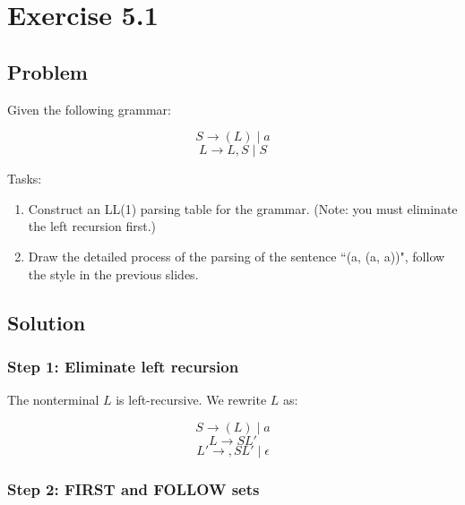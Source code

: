 


\chapter{Exercise 5.1}

\section{Problem}

Given the following grammar:

\[
S \to (L) \;|\; a
\]
\[
L \to L , S \;|\; S
\]

Tasks:
\begin{enumerate}
	\item Construct an LL(1) parsing table for the grammar. (Note: you must eliminate the left recursion first.)
	\item Draw the detailed process of the parsing of the sentence ``(a, (a, a))", follow the style in the previous slides.
\end{enumerate}

\section{Solution}

\subsection{Step 1: Eliminate left recursion}

The nonterminal $L$ is left-recursive. We rewrite $L$ as:

\[
S \to (L) \;|\; a
\]
\[
L \to S L'
\]
\[
L' \to , S L' \;|\; \epsilon
\]

\subsection{Step 2: FIRST and FOLLOW sets}


